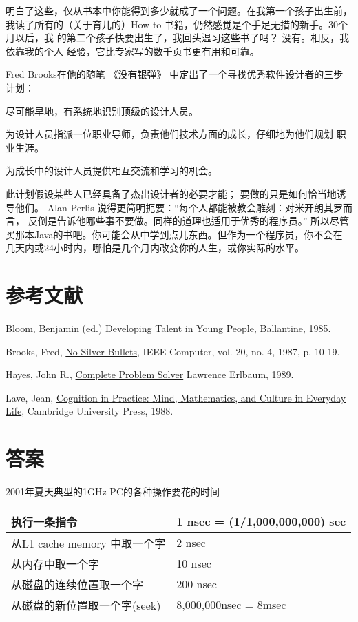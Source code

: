 明白了这些，仅从书本中你能得到多少就成了一个问题。在我第一个孩子出生前， 我读了所有的（关于育儿的）How to 书籍，仍然感觉是个手足无措的新手。30个月以后，我 的第二个孩子快要出生了，我回头温习这些书了吗？ 没有。相反，我依靠我的个人 经验，它比专家写的数千页书更有用和可靠。

Fred Brooks在他的随笔 《没有银弹》 中定出了一个寻找优秀软件设计者的三步计划：

\begin{compactenum}
\item 尽可能早地，有系统地识别顶级的设计人员。
\item 为设计人员指派一位职业导师，负责他们技术方面的成长，仔细地为他们规划 职业生涯。
\item 为成长中的设计人员提供相互交流和学习的机会。
\end{compactenum}

此计划假设某些人已经具备了杰出设计者的必要才能； 要做的只是如何恰当地诱 导他们。 Alan Perlis 说得更简明扼要：“每个人都能被教会雕刻：对米开朗其罗而言， 反倒是告诉他哪些事不要做。同样的道理也适用于优秀的程序员。”
所以尽管买那本Java的书吧。你可能会从中学到点儿东西。但作为一个程序员，你不会在 几天内或24小时内，哪怕是几个月内改变你的人生，或你实际的水平。

\section{参考文献}

Bloom, Benjamin (ed.) \href{http://www.amazon.com/exec/obidos/ASIN/034531509X}{Developing Talent in Young People}, Ballantine, 1985.

Brooks, Fred, \href{http://citeseer.nj.nec.com/context/7718/0}{No Silver Bullets}, IEEE Computer, vol. 20, no. 4, 1987, p. 10-19.

Hayes, John R., \href{http://www.amazon.com/exec/obidos/ASIN/0805803092}{Complete Problem Solver} Lawrence Erlbaum, 1989.

Lave, Jean, \href{http://www.amazon.com/exec/obidos/ASIN/0521357349}{Cognition in Practice: Mind, Mathematics, and Culture in Everyday Life}, Cambridge University Press, 1988.

\section{答案}

2001年夏天典型的1GHz PC的各种操作要花的时间

\begin{tabular}{|l|l|}
\hline
执行一条指令	 &1 nsec = (1/1,000,000,000) sec\\
\hline
从L1 cache memory 中取一个字&	 2 nsec\\
\hline
从内存中取一个字	 &10 nsec\\
\hline
从磁盘的连续位置取一个字	 &200 nsec\\
\hline
从磁盘的新位置取一个字(seek)	& 8,000,000nsec = 8msec\\
\hline
\end{tabular}

